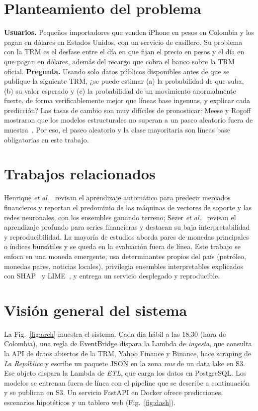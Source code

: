 \documentclass[conference]{IEEEtran}
\begin{document}
\section{Planteamiento del problema}
\textbf{Usuarios.} Pequeños importadores que venden iPhone en pesos en Colombia y los pagan en dólares en Estados Unidos, con un servicio de casillero. Su problema con la TRM es el desfase entre el día en que fijan el precio en pesos y el día en que pagan en dólares, además del recargo que cobra el banco sobre la TRM oficial. \textbf{Pregunta.} Usando solo datos públicos disponibles antes de que se publique la siguiente TRM, ¿se puede estimar (a) la probabilidad de que suba, (b) su valor esperado y (c) la probabilidad de un movimiento anormalmente fuerte, de forma verificablemente mejor que líneas base ingenuas, y explicar cada predicción? Las tasas de cambio son muy difíciles de pronosticar: Meese y Rogoff mostraron que los modelos estructurales no superan a un paseo aleatorio fuera de muestra~\cite{meese1983}. Por eso, el paseo aleatorio y la clase mayoritaria son líneas base obligatorias en este trabajo.

\section{Trabajos relacionados}
Henrique \emph{et al.}~\cite{henrique2019} revisan el aprendizaje automático para predecir mercados financieros y reportan el predominio de las máquinas de vectores de soporte y las redes neuronales, con los ensembles ganando terreno; Sezer \emph{et al.}~\cite{sezer2020} revisan el aprendizaje profundo para series financieras y destacan su baja interpretabilidad y reproducibilidad. La mayoría de estudios aborda pares de monedas principales o índices bursátiles y se queda en la evaluación fuera de línea. Este trabajo se enfoca en una moneda emergente, usa determinantes propios del país (petróleo, monedas pares, noticias locales), privilegia ensembles interpretables explicados con SHAP~\cite{lundberg2017} y LIME~\cite{ribeiro2016}, y entrega un servicio desplegado y reproducible.

\section{Visión general del sistema}
La Fig.~\ref{fig:arch} muestra el sistema. Cada día hábil a las 18:30 (hora de Colombia), una regla de EventBridge dispara la Lambda de \emph{ingesta}, que consulta la API de datos abiertos de la TRM, Yahoo Finance y Binance, hace scraping de \emph{La República} y escribe un paquete JSON en la zona \emph{raw} de un data lake en S3. Ese objeto dispara la Lambda de \emph{ETL}, que carga los datos en PostgreSQL. Los modelos se entrenan fuera de línea con el pipeline que se describe a continuación y se publican en S3. Un servicio FastAPI en Docker ofrece predicciones, escenarios hipotéticos y un tablero web (Fig.~\ref{fig:dash}).
\end{document}
